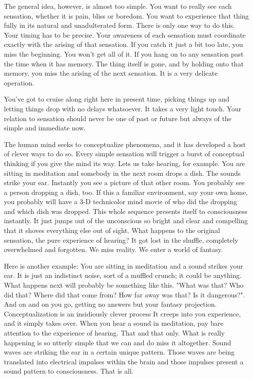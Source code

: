 The general idea, however, is almost too simple. You want to really see each
sensation, whether it is pain, bliss or boredom. You want to experience that
thing fully in its natural and unadulterated form. There is only one way to do
this. Your timing has to be precise. Your awareness of each sensation must
coordinate exactly with the arising of that sensation. If you catch it just a
bit too late, you miss the beginning. You won't get all of it. If you hang on to
any sensation past the time when it has memory. The thing itself is gone, and by
holding onto that memory, you miss the arising of the next sensation. It is a
very delicate operation.

You've got to cruise along right here in present time, picking things up and
letting things drop with no delays whatsoever. It takes a very light touch. Your
relation to sensation should never be one of past or future but always of the
simple and immediate now.

The human mind seeks to conceptualize phenomena, and it has developed a host of clever ways to do so. Every simple sensation
will trigger a burst of conceptual thinking if you give the mind its way. Lets us take hearing, for example. You are sitting in
meditation and somebody in the next room drops a dish. The sounds strike your ear. Instantly you see a picture of that other
room. You probably see a person dropping a dish, too. If this a familiar environment, say your own home, you probably will have
a 3-D technicolor mind movie of who did the dropping and which dish was dropped. This whole sequence presents itself to
consciousness instantly. It just jumps out of the unconscious so bright and clear and compelling that it shoves everything else out
of sight. What happens to the original sensation, the pure experience of hearing? It got lost in the shuffle, completely overwhelmed
and forgotten. We miss reality. We enter a world of fantasy.

Here is another example: You are sitting in meditation and a sound strikes your
ear. It is just an indistinct noise, sort of a muffled crunch; it could be
anything. What happens next will probably be something like this. "What was
that? Who did that? Where did that come from? How far away was that? Is it
dangerous?". And on and on you go, getting no answers but your fantasy
projection. Conceptualization is an insidiously clever process It creeps into
you experience, and it simply takes over. When you hear a sound in meditation,
pay bare attention to the experience of hearing. That and that only. What is
really happening is so utterly simple that we can and do miss it altogether.
Sound waves are striking the ear in a certain unique pattern. Those waves are
being translated into electrical impulses within the brain and those impulses
present a sound pattern to consciousness. That is all.

